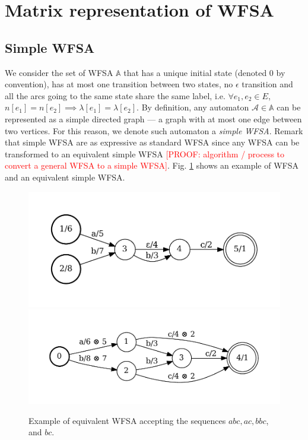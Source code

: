 \section{Matrix representation of WFSA}

\subsection{Simple WFSA}

We consider the set of WFSA $\mathbb{A}$ that has a unique initial state (denoted $0$ by convention), has at most one transition between two states, no $\epsilon$ transition and all the arcs going to the same state share the same label, i.e. $\forall e_1, e_2 \in E$, $n[e_1] = n[e_2] \implies \lambda[e_1] = \lambda[e_2]$. By definition, any automaton $\mathcal{A} \in \mathbb{A}$ can be represented as a simple directed graph --- a graph with at most one edge between two vertices. For this reason, we denote such automaton a \emph{simple WFSA}. Remark that simple WFSA are as expressive as standard WFSA since any WFSA can be transformed to an equivalent simple WFSA \textcolor{red}{[PROOF: algorithm / process to convert a general WFSA to a simple WFSA]}. Fig. \ref{fig:wfsa} shows an example of WFSA and an equivalent simple WFSA. 
%
\begin{figure}[t] %
    \centering 
        {\includegraphics[width=0.7\linewidth]{images/reg_fsa.pdf}}
        {\includegraphics[width=0.7\linewidth]{images/simple_fsa.pdf}}
    \caption{Example of equivalent WFSA accepting the sequences $abc, ac, bbc$, and $bc$.}
    \label{fig:wfsa}
\end{figure}
%

